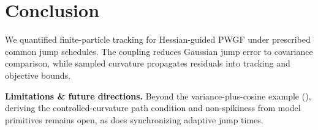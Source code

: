 \section{Conclusion}
\label{sec:conclusion}

We quantified finite-particle tracking for Hessian-guided PWGF under prescribed
common jump schedules. The coupling reduces Gaussian jump error to covariance
comparison, while sampled curvature propagates residuals into tracking and
objective bounds.

\noindent\textbf{Limitations \& future directions.}
Beyond the variance-plus-cosine example
(), deriving the controlled-curvature
path condition and non-spikiness from model primitives remains open,
as does synchronizing adaptive jump times.
